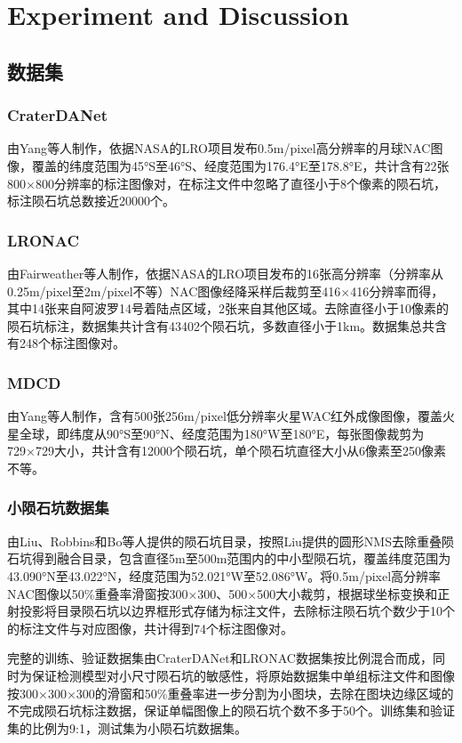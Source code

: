 \section{Experiment and Discussion}
\label{sec:experiment and discussion}
\subsection{数据集}
\subsubsection{CraterDANet}
由Yang\cite{yangCraterDANetConvolutionalNeural2022}等人制作，依据NASA的LRO项目发布0.5m/pixel高分辨率的月球NAC图像，覆盖的纬度范围为45°S至46°S、经度范围为176.4°E至178.8°E，共计含有22张800×800分辨率的标注图像对，在标注文件中忽略了直径小于8个像素的陨石坑，标注陨石坑总数接近20000个。
\subsubsection{LRONAC}
由Fairweather\cite{fairweatherAutomaticMappingSmall2022}等人制作，依据NASA的LRO项目发布的16张高分辨率（分辨率从0.25m/pixel至2m/pixel不等）NAC图像经降采样后裁剪至416$\times$416分辨率而得，其中14张来自阿波罗14号着陆点区域，2张来自其他区域。去除直径小于10像素的陨石坑标注，数据集共计含有43402个陨石坑，多数直径小于1km。数据集总共含有248个标注图像对。
\subsubsection{MDCD}
由Yang\cite{yangHighresolutionFeaturePyramid2022}等人制作，含有500张256m/pixel低分辨率火星WAC红外成像图像，覆盖火星全球，即纬度从90°S至90°N、经度范围为180°W至180°E，每张图像裁剪为729×729大小，共计含有12000个陨石坑，单个陨石坑直径大小从6像素至250像素不等。
\subsubsection{小陨石坑数据集}
\label{sec:small crater dataset}由Liu\cite{liuIdentificationLunarCraters2024}、Robbins\cite{robbinsNewGlobalDatabase2019}和Bo\cite{boCatalogueMeterscaleImpact2022}等人提供的陨石坑目录，按照Liu\cite{liuIdentificationLunarCraters2024}提供的圆形NMS去除重叠陨石坑得到融合目录，包含直径5m至500m范围内的中小型陨石坑，覆盖纬度范围为43.090°N至43.022°N，经度范围为52.021°W至52.086°W。将0.5m/pixel高分辨率NAC图像以50\%重叠率滑窗按300×300、500×500大小裁剪，根据球坐标变换和正射投影将目录陨石坑以边界框形式存储为标注文件，去除标注陨石坑个数少于10个的标注文件与对应图像，共计得到74个标注图像对。\par
完整的训练、验证数据集由CraterDANet和LRONAC数据集按比例混合而成，同时为保证检测模型对小尺寸陨石坑的敏感性，将原始数据集中单组标注文件和图像按300$\times$300$\times$300的滑窗和50\%重叠率进一步分割为小图块，去除在图块边缘区域的不完成陨石坑标注数据，保证单幅图像上的陨石坑个数不多于50个。训练集和验证集的比例为9:1，测试集为小陨石坑数据集。
